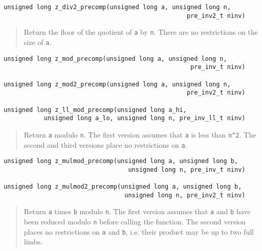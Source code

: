 \documentclass[a4paper,10pt]{article}
\newcommand{\code}{\lstinline}
\begin{document}
\begin{lstlisting}
unsigned long z_div2_precomp(unsigned long a, unsigned long n, 
                                                  pre_inv2_t ninv)
\end{lstlisting}
\begin{quote}
Return the floor of the quotient of \code{a} by \code{n}. There are no restrictions on the size of \code{a}.
\end{quote}

\begin{lstlisting}
unsigned long z_mod_precomp(unsigned long a, unsigned long n, 
                                                   pre_inv_t ninv)

unsigned long z_mod2_precomp(unsigned long a, unsigned long n, 
                                                  pre_inv2_t ninv)

unsigned long z_ll_mod_precomp(unsigned long a_hi,
           unsigned long a_lo, unsigned long n, pre_inv_ll_t ninv)
\end{lstlisting}
\begin{quote}
Return \code{a} modulo \code{n}. The first version assumes that \code{a} is less than \code{n^2}. The second and third versions place no restrictions on \code{a}.
\end{quote}

\begin{lstlisting}
unsigned long z_mulmod_precomp(unsigned long a, unsigned long b, 
                                  unsigned long n, pre_inv_t ninv)
                                         
unsigned long z_mulmod2_precomp(unsigned long a, unsigned long b, 
                                 unsigned long n, pre_inv2_t ninv)
\end{lstlisting}
\begin{quote}
Return \code{a} times \code{b} modulo \code{n}. The first version assumes that \code{a} and \code{b} have been reduced modulo \code{n} before calling the function. The second version places no restrictions on \code{a} and \code{b}, i.e. their product may be up to two full limbs.
\end{quote}
                                         
\end{document}
